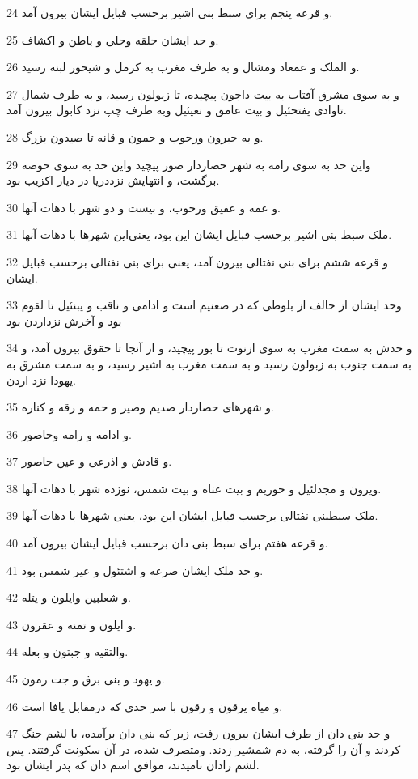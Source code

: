 \par 24 و قرعه پنجم برای سبط بنی اشیر برحسب قبایل ایشان بیرون آمد.
\par 25 و حد ایشان حلقه وحلی و باطن و اکشاف.
\par 26 و الملک و عمعاد ومشال و به طرف مغرب به کرمل و شیحور لبنه رسید.
\par 27 و به سوی مشرق آفتاب به بیت داجون پیچیده، تا زبولون رسید، و به طرف شمال تاوادی یفتحئیل و بیت عامق و نعیئیل وبه طرف چپ نزد کابول بیرون آمد.
\par 28 و به حبرون ورحوب و حمون و قانه تا صیدون بزرگ.
\par 29 واین حد به سوی رامه به شهر حصاردار صور پیچید واین حد به سوی حوصه برگشت، و انتهایش نزددریا در دیار اکزیب بود.
\par 30 و عمه و عفیق ورحوب، و بیست و دو شهر با دهات آنها.
\par 31 ملک سبط بنی اشیر برحسب قبایل ایشان این بود، یعنی‌این شهرها با دهات آنها.
\par 32 و قرعه ششم برای بنی نفتالی بیرون آمد، یعنی برای بنی نفتالی برحسب قبایل ایشان.
\par 33 وحد ایشان از حالف از بلوطی که در صعنیم است و ادامی و ناقب و یبنئیل تا لقوم بود و آخرش نزداردن بود
\par 34 و حدش به سمت مغرب به سوی ازنوت تا بور پیچید، و از آنجا تا حقوق بیرون آمد، و به سمت جنوب به زبولون رسید و به سمت مغرب به اشیر رسید، و به سمت مشرق به یهودا نزد اردن.
\par 35 و شهرهای حصاردار صدیم وصیر و حمه و رقه و کناره.
\par 36 و ادامه و رامه وحاصور.
\par 37 و قادش و اذرعی و عین حاصور.
\par 38 ویرون و مجدلئیل و حوریم و بیت عناه و بیت شمس، نوزده شهر با دهات آنها.
\par 39 ملک سبطبنی نفتالی برحسب قبایل ایشان این بود، یعنی شهرها با دهات آنها.
\par 40 و قرعه هفتم برای سبط بنی دان برحسب قبایل ایشان بیرون آمد.
\par 41 و حد ملک ایشان صرعه و اشتئول و عیر شمس بود.
\par 42 و شعلبین وایلون و یتله.
\par 43 و ایلون و تمنه و عقرون.
\par 44 والتقیه و جبتون و بعله.
\par 45 و یهود و بنی برق و جت رمون.
\par 46 و میاه یرقون و رقون با سر حدی که درمقابل یافا است.
\par 47 و حد بنی دان از طرف ایشان بیرون رفت، زیر که بنی دان برآمده، با لشم جنگ کردند و آن را گرفته، به دم شمشیر زدند. ومتصرف شده، در آن سکونت گرفتند. پس لشم رادان نامیدند، موافق اسم دان که پدر ایشان بود.
